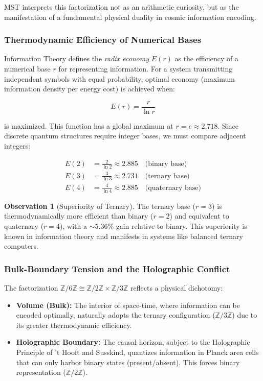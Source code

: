 \documentclass[11pt, a4paper]{article}
\theoremstyle{plain}
\theoremstyle{definition}
\newtheorem{observation}[theorem]{Observation}
\newcommand{\Zmod}{\mathbb{Z}/6\mathbb{Z}}
\begin{document}
MST interprets this factorization not as an arithmetic curiosity, but as the manifestation of a fundamental physical duality in cosmic information encoding.

\subsubsection{Thermodynamic Efficiency of Numerical Bases}

Information Theory defines the \textit{radix economy} $E(r)$ as the efficiency of a numerical base $r$ for representing information. For a system transmitting independent symbols with equal probability, optimal economy (maximum information density per energy cost) is achieved when:

\begin{equation}
E(r) = \frac{r}{\ln r}
\end{equation}

is maximized. This function has a global maximum at $r = e \approx 2.718$. Since discrete quantum structures require integer bases, we must compare adjacent integers:

\begin{align}
E(2) &= \frac{2}{\ln 2} \approx 2.885 \quad \text{(binary base)} \\
E(3) &= \frac{3}{\ln 3} \approx 2.731 \quad \text{(ternary base)} \\
E(4) &= \frac{4}{\ln 4} \approx 2.885 \quad \text{(quaternary base)}
\end{align}

\begin{observation}[Superiority of Ternary]
The ternary base ($r=3$) is thermodynamically more efficient than binary ($r=2$) and equivalent to quaternary ($r=4$), with a $\sim 5.36\%$ gain relative to binary. This superiority is known in information theory and manifests in systems like balanced ternary computers.
\end{observation}

\subsubsection{Bulk-Boundary Tension and the Holographic Conflict}

The factorization $\Zmod \cong \mathbb{Z}/2\mathbb{Z} \times \mathbb{Z}/3\mathbb{Z}$ reflects a physical dichotomy:

\begin{itemize}
    \item \textbf{Volume (Bulk):} The interior of space-time, where information can be encoded optimally, naturally adopts the ternary configuration ($\mathbb{Z}/3\mathbb{Z}$) due to its greater thermodynamic efficiency.
    
    \item \textbf{Holographic Boundary:} The causal horizon, subject to the Holographic Principle of 't Hooft and Susskind, quantizes information in Planck area cells that can only harbor binary states (present/absent). This forces binary representation ($\mathbb{Z}/2\mathbb{Z}$).
\end{itemize}
\end{document}
